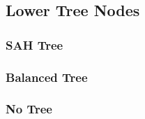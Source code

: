 



\subsection{Lower Tree Nodes}

\subsubsection{SAH Tree}

\subsubsection{Balanced Tree}

\subsubsection{No Tree}








